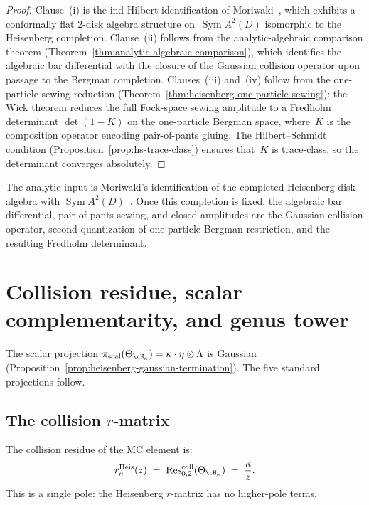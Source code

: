 \begin{proof}
Clause~(i) is the ind-Hilbert identification of
Moriwaki~\cite{Moriwaki26b}, which exhibits a conformally flat 2-disk
algebra structure on~$\operatorname{Sym} A^2(D)$ isomorphic to the
Heisenberg completion.
Clause~(ii) follows from the analytic-algebraic comparison theorem
(Theorem~\ref{thm:analytic-algebraic-comparison}), which identifies
the algebraic bar differential with the closure of the Gaussian
collision operator upon passage to the Bergman completion.
Clauses~(iii) and~(iv) follow from the one-particle sewing reduction
(Theorem~\ref{thm:heisenberg-one-particle-sewing}): the Wick theorem
reduces the full Fock-space sewing amplitude to a Fredholm determinant
$\det(1 - K)$ on the one-particle Bergman space, where~$K$ is the
composition operator encoding pair-of-pants gluing.
The Hilbert--Schmidt condition
(Proposition~\ref{prop:hs-trace-class}) ensures that~$K$ is
trace-class, so the determinant converges absolutely.
\end{proof}

\begin{remark}\label{rem:heisenberg-sewing-input}
The analytic input is Moriwaki's identification
of the completed Heisenberg disk algebra with
$\operatorname{Sym}A^2(D)$~\cite{Moriwaki26b}. Once this completion
is fixed, the algebraic bar differential, pair-of-pants sewing, and
closed amplitudes are the Gaussian collision operator, second
quantization of one-particle Bergman restriction, and the resulting
Fredholm determinant.
\end{remark}

\section{Collision residue, scalar complementarity, and genus tower}
\label{sec:heisenberg-projections}

The scalar projection
$\pi_{\mathrm{scal}}(\Theta_{\cH_\kappa})
= \kappa \cdot \eta \otimes \Lambda$
is Gaussian (Proposition~\ref{prop:heisenberg-gaussian-termination}).
The five standard projections follow.

\subsection{The collision \texorpdfstring{$r$}{r}-matrix}
\label{subsec:heisenberg-r-matrix}

\begin{proposition}
\label{prop:heisenberg-r-matrix}
The collision residue of the MC element is:
\begin{equation}\label{eq:heisenberg-r-matrix}
r^{\mathrm{Heis}}_\kappa(z)
\;=\; \operatorname{Res}^{\mathrm{coll}}_{0,2}(\Theta_{\cH_\kappa})
\;=\; \frac{\kappa}{z}.
\end{equation}
This is a single pole: the Heisenberg $r$-matrix has no
higher-pole terms.
\end{proposition}

